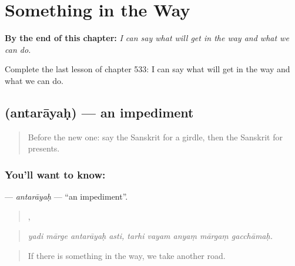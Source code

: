 
\chapter{Something in the Way}
\label{ch:sa-something-in-the-way}

\begin{chapteropening}
\textbf{By the end of this chapter:} \emph{I can say what will get in the way and what we can do.}

Complete the last lesson of chapter 533: I can say what will get in the way and what we can do.
\end{chapteropening}

\section[\texorpdfstring{\sk{अन्तरायः} (antarāyaḥ)}{अन्तरायः (antarāyaḥ)}]{ (antarāyaḥ) — an impediment}

\label{lesson:SA-C533-antarayah}



\begin{quote}
Before the new one: say the Sanskrit for a girdle, then the Sanskrit for presents.
\end{quote}

\subsection*{You'll want to know: }
\textbf{} — \emph{antarāyaḥ} — \textquotedblleft{}an impediment\textquotedblright{}.

\begin{quote}
   ,     
\end{quote}

\begin{quote}
\emph{yadi mārge antarāyaḥ asti, tarhi vayam anyaṃ mārgaṃ gacchāmaḥ.}
\end{quote}

\begin{quote}
If there is something in the way, we take another road.
\end{quote}


